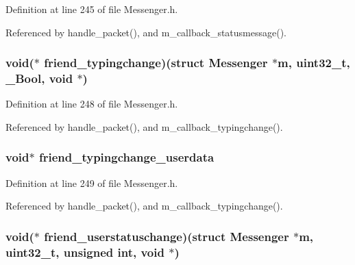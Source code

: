 Definition at line 245 of file Messenger.\+h.



Referenced by handle\+\_\+packet(), and m\+\_\+callback\+\_\+statusmessage().

\hypertarget{struct_messenger_a2d1cf25845a2a7d1b1f90916679fb4fe}{
\subsubsection[{friend\+\_\+typingchange}]{\setlength{\rightskip}{0pt plus 5cm}void($\ast$ friend\+\_\+typingchange)(struct {\bf Messenger} $\ast${\bf m}, uint32\+\_\+t, \+\_\+\+Bool, void $\ast$)}}\label{struct_messenger_a2d1cf25845a2a7d1b1f90916679fb4fe}


Definition at line 248 of file Messenger.\+h.



Referenced by handle\+\_\+packet(), and m\+\_\+callback\+\_\+typingchange().

\hypertarget{struct_messenger_a597c89e529b39b6f08251d586c1379e7}{
\subsubsection[{friend\+\_\+typingchange\+\_\+userdata}]{\setlength{\rightskip}{0pt plus 5cm}void$\ast$ friend\+\_\+typingchange\+\_\+userdata}}\label{struct_messenger_a597c89e529b39b6f08251d586c1379e7}


Definition at line 249 of file Messenger.\+h.



Referenced by handle\+\_\+packet(), and m\+\_\+callback\+\_\+typingchange().

\hypertarget{struct_messenger_a61d62ee2f1f496b742acdcdf2c02f388}{
\subsubsection[{friend\+\_\+userstatuschange}]{\setlength{\rightskip}{0pt plus 5cm}void($\ast$ friend\+\_\+userstatuschange)(struct {\bf Messenger} $\ast${\bf m}, uint32\+\_\+t, unsigned int, void $\ast$)}}\label{struct_messenger_a61d62ee2f1f496b742acdcdf2c02f388}


